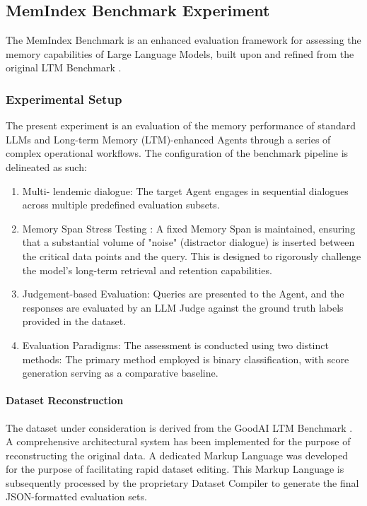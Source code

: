 \subsection{MemIndex Benchmark Experiment}
The MemIndex Benchmark is an enhanced evaluation framework for assessing the memory capabilities of Large Language Models, built upon and refined from the original LTM Benchmark \ph{[ref]}.

\subsubsection{Experimental Setup}

The present experiment is an evaluation of the memory performance of standard LLMs and Long-term Memory (LTM)-enhanced Agents through a series of complex operational workflows. The configuration of the benchmark pipeline is delineated as such:

\begin{enumerate}
\item Multi- lendemic dialogue: The target Agent engages in sequential dialogues across multiple predefined evaluation subsets.

\item Memory Span Stress Testing : A fixed Memory Span is maintained, ensuring that a substantial volume of "noise" (distractor dialogue) is inserted between the critical data points and the query. This is designed to rigorously challenge the model's long-term retrieval and retention capabilities.

\item Judgement-based Evaluation: Queries are presented to the Agent, and the responses are evaluated by an LLM Judge against the ground truth labels provided in the dataset.

\item Evaluation Paradigms: The assessment is conducted using two distinct methods: The primary method employed is binary classification, with score generation serving as a comparative baseline.
\end{enumerate}

\paragraph{Dataset Reconstruction}

The dataset under consideration is derived from the GoodAI LTM Benchmark \ph{[ref]}. A comprehensive architectural system has been implemented for the purpose of reconstructing the original data. A dedicated Markup Language was developed for the purpose of facilitating rapid dataset editing. This Markup Language is subsequently processed by the proprietary Dataset Compiler to generate the final JSON-formatted evaluation sets.

